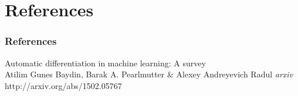 \section{References}
\begin{frame}
\frametitle{References}
\footnotesize{
	\begin{thebibliography}{99}
		 Automatic differentiation in machine learning: A survey\\
		\newblock Atilim Gunes Baydin, Barak A. Pearlmutter \& Alexey Andreyevich Radul
		\newblock \emph{arxiv} http://arxiv.org/abs/1502.05767
		
	\end{thebibliography}
}
\end{frame}

